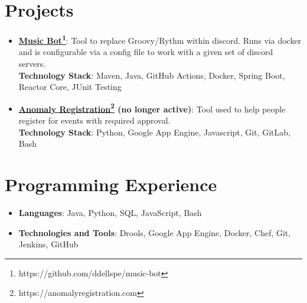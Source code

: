 \documentclass[letterpaper,11pt]{article}
\newcommand{\resumeItemWithTech}[3]{
  \item\small{
    \textbf{#1}{: #2 \vspace{-2pt}}\\
    \textbf{Technology Stack}{: #3 \vspace{-2pt}}
  }
}
\newcommand{\resumePositionListStart}{\begin{itemize}[leftmargin=*,label={}]}
\newcommand{\resumePositionListEnd}{\end{itemize}}
\newcommand{\resumeSubItemWithTech}[3]{\resumeItemWithTech{#1}{#2}{#3}\vspace{-4pt}}
\begin{document}
\section{Projects}
  \resumePositionListStart
    \resumeSubItemWithTech{\href{https://github.com/ddellspe/music-bot}{Music Bot}\footnote{https://github.com/ddellspe/music-bot}}
      {Tool to replace Groovy/Rythm within discord. Runs via docker and is configurable via a config file to work with a given set of discord servers.}
      {Maven, Java, GitHub Actions, Docker, Spring Boot, Reactor Core, JUnit Testing}
    \resumeSubItemWithTech{\href{https://anomalyregistration.com}{Anomaly Registration}\footnote{https://anomalyregistration.com} (no longer active)}
      {Tool used to help people register for events with required approval.}
      {Python, Google App Engine, Javascript, Git, GitLab, Bash}
  \resumePositionListEnd


\section{Programming Experience}
  \resumePositionListStart
    \item{
      \textbf{Languages}{: Java, Python, SQL, JavaScript, Bash}
    }\vspace{-8pt}
    \item{
      \textbf{Technologies and Tools}{: Drools, Google App Engine, Docker, Chef, Git, Jenkins, GitHub}
    }\vspace{-8pt}
  \resumePositionListEnd
\end{document}
